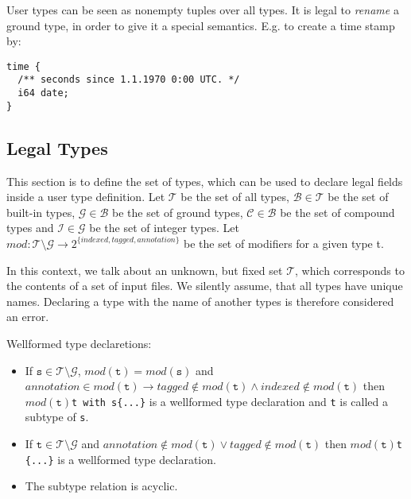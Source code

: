 \documentclass[a4paper,10pt]{article}
\begin{document}
User types can be seen as nonempty tuples over all types. It is legal to \textit{rename} a ground type, in order to give it a special semantics. E.g. to create a time stamp by:
\begin{verbatim}
time {
  /** seconds since 1.1.1970 0:00 UTC. */
  i64 date;
}
\end{verbatim}

\subsection*{Legal Types}

This section is to define the set of types, which can be used to declare legal fields inside a user type definition. Let $\mathcal{T}$ be the set of all types, $\mathcal{B} \in \mathcal{T}$ be the set of built-in types, $\mathcal{G} \in \mathcal{B}$ be the set of ground types, $\mathcal{C} \in \mathcal{B}$ be the set of compound types and $\mathcal{I} \in \mathcal{G}$ be the set of integer types. Let $mod: \mathcal{T}\setminus\mathcal{G} \rightarrow 2^{\{indexed, tagged, annotation\}}$ be the set of modifiers for a given type t.

In this context, we talk about an unknown, but fixed set $\mathcal{T}$, which corresponds to the contents of a set of input files. We silently assume, that all types have unique names. Declaring a type with the name of another types is therefore considered an error.

Wellformed type declaretions:
\begin{itemize}
 \item If $\texttt{s} \in \mathcal{T}\setminus\mathcal{G}$, $mod(\texttt{t}) = mod(\texttt{s})$ and $annotation \in mod(\texttt{t}) \rightarrow tagged \notin mod(\texttt{t}) \wedge indexed \notin mod(\texttt{t})$ then $mod(\texttt{t})$\verb/t with s{...}/ is a wellformed type declaration and \texttt{t} is called a subtype of \texttt{s}.
 
 \item If $\texttt{t} \in \mathcal{T}\setminus\mathcal{G}$ and $annotation \notin mod(\texttt{t}) \vee tagged \notin mod(\texttt{t})$ then $mod(\texttt{t})$\verb/t {...}/ is a wellformed type declaration.
 
 \item The subtype relation is acyclic.
\end{itemize}
\end{document}
